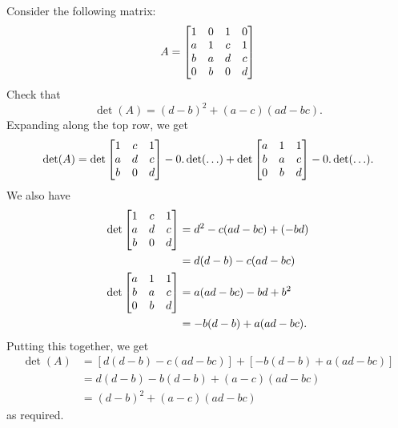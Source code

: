 \documentclass[a4paper]{book}
\theoremstyle{definition}
\newenvironment{starex}{
 \renewcommand{\thetheorem}{\arabic{chapter}.\arabic{section}.\arabic{theorem}${}^*$}
 \exercise
}{\endexercise}
\renewenvironment{solution}{\SolutionInline}{\endSolutionInline}
\begin{document}
\begin{starex}
 Consider the following matrix:
 \[ A = \begin{bmatrix}
          1 & 0 & 1 & 0 \\
          a & 1 & c & 1 \\
          b & a & d & c \\
          0 & b & 0 & d
        \end{bmatrix}
 \]
 Check that
 \[ \det(A) = (d-b)^2 + (a-c)(ad - bc). \]
\end{starex}
\begin{solution}
 Expanding along the top row, we get
 \[ \det(A) =
     \det\begin{bmatrix} 1&c&1 \\ a&d&c \\ b&0&d \end{bmatrix}
   - 0.\det(\ldots)
   + \det\begin{bmatrix} a&1&1 \\ b&a&c \\ 0&b&d \end{bmatrix}
   - 0.\det(\ldots).
 \]
 We also have
 \begin{align*}
  \det\begin{bmatrix} 1&c&1 \\ a&d&c \\ b&0&d \end{bmatrix}
   &= d^2 -c(ad-bc) + (-bd) \\
   &= d(d-b) - c(ad-bc) \\
  \det\begin{bmatrix} a&1&1 \\ b&a&c \\ 0&b&d \end{bmatrix}
   &= a(ad-bc) - bd + b^2 \\
   &= -b(d-b) + a(ad-bc).
 \end{align*}
 Putting this together, we get
 \begin{align*}
  \det(A) &= [d(d-b) - c(ad-bc)] + [-b(d-b) + a(ad-bc)] \\
          &= d(d-b) - b(d-b) + (a-c)(ad-bc) \\
          &= (d-b)^2 + (a-c)(ad-bc)
 \end{align*}
 as required.
\end{solution}
\end{document}
